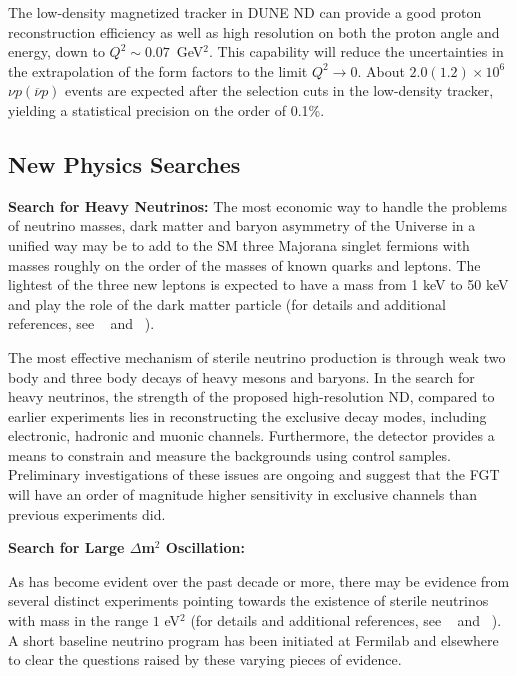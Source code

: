 The low-density magnetized tracker in DUNE ND can provide a good proton reconstruction efficiency as well as
high resolution on both the proton angle and energy, down to $Q^2\sim0.07$~GeV$^2$. 
This capability will reduce the uncertainties in the extrapolation of the form factors to the limit
$Q^2 \to 0$. About $2.0 (1.2) \times 10^6$ $\nu p
(\overline{\nu} p)$ events are expected after the selection cuts in
the low-density tracker, yielding a statistical precision on the order
of 0.1\%.



\subsection{New Physics Searches} 
\label{sec-nd-np} 

\vspace{0.25cm} 
\noindent 
{\bf Search for Heavy Neutrinos:} 
The most economic way to handle the problems of neutrino masses, dark matter and baryon asymmetry of the Universe in a unified way may be to add to the SM three Majorana singlet fermions with masses roughly on the order of the masses of known quarks and leptons. 
 The lightest of the three new leptons is expected to have a mass from 1 keV to 50 keV and play the role of the dark matter particle (for details and additional references, see ~\cite{DPR} and ~\cite{LBNE-SCI}).

The most effective  mechanism of sterile neutrino production is through weak two body and three body decays of heavy mesons and baryons. In the search for heavy neutrinos, the strength of the proposed high-resolution ND, compared to earlier experiments lies in reconstructing the exclusive decay modes, including electronic, hadronic and muonic channels. Furthermore, the detector provides a means to constrain and measure the backgrounds using control samples. Preliminary investigations of these issues are ongoing and  suggest that the FGT  will have an order of magnitude higher sensitivity in exclusive channels than previous experiments did. 

\vspace{0.25cm} 
\noindent 
{\bf Search for Large $\Delta$m$^2$ Oscillation:} 

As has become evident over the past decade or more, there may be evidence from several distinct experiments pointing towards the existence of sterile neutrinos with mass in the range $1$ eV$^2$ (for details and additional references, see ~\cite{DPR} and ~\cite{LBNE-SCI}).  A short baseline neutrino program has been initiated at Fermilab and elsewhere to clear the questions raised by these varying pieces of evidence.  

